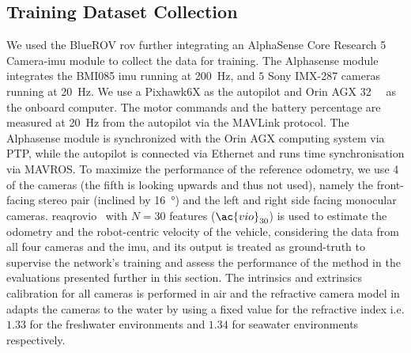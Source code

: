 \subsection{Training Dataset Collection}
We used the BlueROV \ac{rov} further integrating an AlphaSense Core Research 5 Camera-\ac{imu} module to collect the data for training. The Alphasense module integrates the BMI085 \ac{imu} running at \SI{200}{\hertz}, and $5$ Sony IMX-287 cameras running at \SI{20}{\hertz}. We use a Pixhawk6X as the autopilot and Orin AGX \SI{32}{\giga\byte} as the onboard computer. The motor commands and the battery percentage are measured at \SI{20}{\hertz} from the autopilot via the MAVLink protocol. The Alphasense module is synchronized with the Orin AGX computing system via PTP, while the autopilot is connected via Ethernet and runs time synchronisation via MAVROS. To maximize the performance of the reference odometry, we use 4 of the cameras (the fifth is looking upwards and thus not used), namely the front-facing stereo pair (inclined by \SI{16}{\degree}) and the left and right side facing monocular cameras. \ac{reaqrovio}~\cite{SinghRCMinRovio2024} with $N=30$ features ($\ac{vio}_{30}$) is used to estimate the odometry and the robot-centric velocity of the vehicle, considering the data from all four cameras and the \ac{imu}, and its output is treated as ground-truth to supervise the network's training and assess the performance of the method in the evaluations presented further in this section. The intrinsics and extrinsics calibration for all cameras is performed in air and the refractive camera model in \cite{SinghRCMinRovio2024} adapts the cameras to the water by using a fixed value for the refractive index i.e. $1.33$ for the freshwater environments and $1.34$ for seawater environments respectively. 

